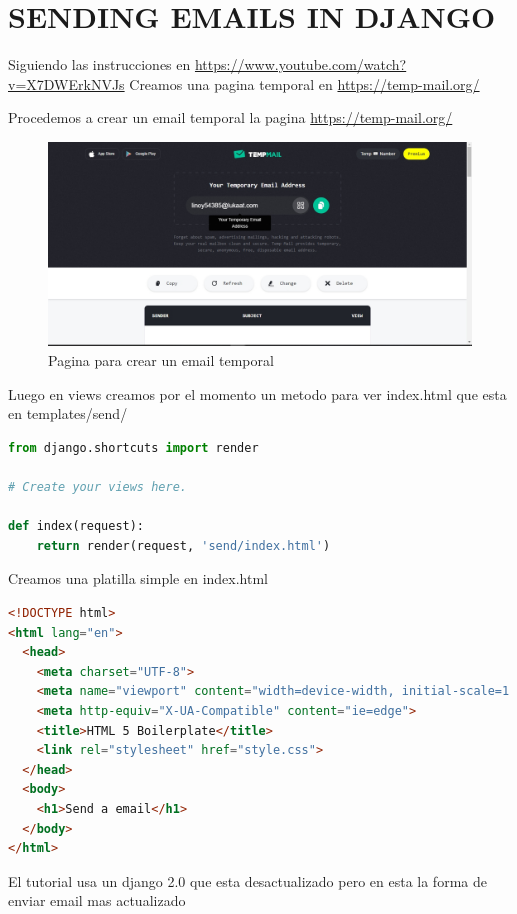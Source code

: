 \documentclass{article}
\begin{document}
\section{SENDING EMAILS IN DJANGO}
Siguiendo las instrucciones en \url{https://www.youtube.com/watch?v=X7DWErkNVJs} Creamos una pagina temporal en \url{https://temp-mail.org/}

Procedemos a crear un email temporal la pagina \url{https://temp-mail.org/}  

\begin{figure}[!h]
    \centering
    \includegraphics[scale=1.3]{img/tempemail.jpg}
    \caption{Pagina para crear un email temporal }
    \label{fig:enter-label}
\end{figure}


Luego en views creamos por el momento un metodo para ver index.html que esta en templates/send/

\begin{lstlisting}[language=Python]
from django.shortcuts import render

# Create your views here.

def index(request):
    return render(request, 'send/index.html')
\end{lstlisting}

Creamos una platilla simple en index.html

\begin{lstlisting}[language=HTML]
<!DOCTYPE html>
<html lang="en">
  <head>
    <meta charset="UTF-8">
    <meta name="viewport" content="width=device-width, initial-scale=1.0">
    <meta http-equiv="X-UA-Compatible" content="ie=edge">
    <title>HTML 5 Boilerplate</title>
    <link rel="stylesheet" href="style.css">
  </head>
  <body>
	<h1>Send a email</h1>
  </body>
</html>
\end{lstlisting}

El tutorial usa un django 2.0 que esta desactualizado pero en \cite{django_mail} esta la forma de enviar email mas actualizado
\end{document}
